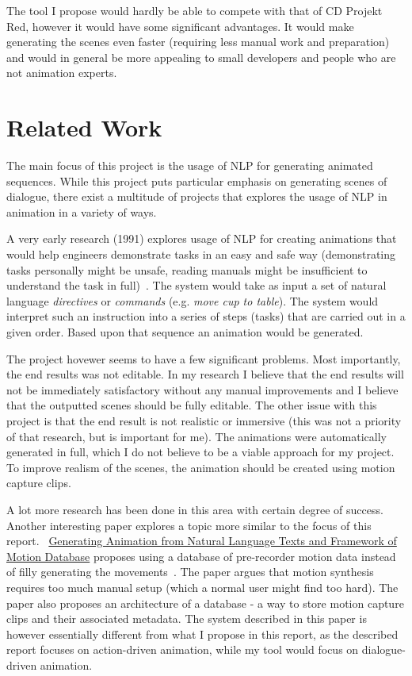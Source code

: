 The tool I propose would hardly be able to compete with that of CD Projekt Red, however it would have some significant advantages. It would make generating the scenes even faster (requiring less manual work and preparation) and would in general be more appealing to small developers and people who are not animation experts.

\section{Related Work}
The main focus of this project is the usage of NLP for generating animated sequences. While this project puts particular emphasis on generating scenes of dialogue, there exist a multitude of projects that explores the usage of NLP in animation in a variety of ways.

A very early research (1991) explores usage of NLP for creating animations that would help engineers demonstrate tasks in an easy and safe way (demonstrating tasks personally might be unsafe, reading manuals might be insufficient to understand the task in full)~\cite{animosha}. The system would take as input a set of natural language \textit{directives} or \textit{commands} (e.g. \textit{move cup to table}). The system would interpret such an instruction into a series of steps (tasks) that are carried out in a given order. Based upon that sequence an animation would be generated.

The project hovewer seems to have a few significant problems. Most importantly, the end results was not editable. In my research I believe that the end results will not be immediately satisfactory without any manual improvements and I believe that the outputted scenes should be fully editable. The other issue with this project is that the end result is not realistic or immersive (this was not a priority of that research, but is important for me). The animations were automatically generated in full, which I do not believe to be a viable approach for my project. To improve realism of the scenes, the animation should be created using motion capture clips.

A lot more research has been done in this area with certain degree of success. Another interesting paper explores a topic more similar to the focus of this report. ~\url{Generating Animation from Natural Language Texts and Framework of Motion Database} proposes using a database of pre-recorder motion data instead of filly generating the movements~\cite{animmc}. The paper argues that motion synthesis requires too much manual setup (which a normal user might find too hard). The paper also proposes an architecture of a database -  a way to store motion capture clips and their associated metadata. The system described in this paper is however essentially different from what I propose in this report, as the described report focuses on action-driven animation, while my tool would focus on dialogue-driven animation.

